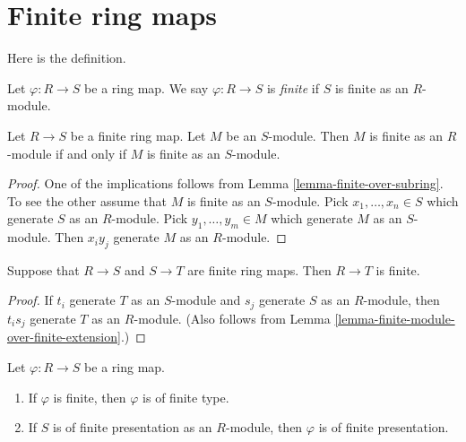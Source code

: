 \section{Finite ring maps}
\label{section-finite}

\noindent
Here is the definition.

\begin{definition}
\label{definition-finite-ring-map}
Let $\varphi : R \to S$ be a ring map. We say $\varphi : R \to S$ is
{\it finite} if $S$ is finite as an $R$-module.
\end{definition}

\begin{lemma}
\label{lemma-finite-module-over-finite-extension}
Let $R \to S$ be a finite ring map.
Let $M$ be an $S$-module.
Then $M$ is finite as an $R$-module if and only if $M$ is finite
as an $S$-module.
\end{lemma}

\begin{proof}
One of the implications follows from
Lemma \ref{lemma-finite-over-subring}.
To see the other assume that $M$ is finite as an $S$-module.
Pick $x_1, \ldots, x_n \in S$ which generate $S$ as an $R$-module.
Pick $y_1, \ldots, y_m \in M$ which generate $M$ as an $S$-module.
Then $x_i y_j$ generate $M$ as an $R$-module.
\end{proof}

\begin{lemma}
\label{lemma-finite-transitive}
Suppose that $R \to S$ and $S \to T$ are finite ring maps.
Then $R \to T$ is finite.
\end{lemma}

\begin{proof}
If $t_i$ generate $T$ as an $S$-module and $s_j$ generate $S$ as an
$R$-module, then $t_i s_j$ generate $T$ as an $R$-module.
(Also follows from
Lemma \ref{lemma-finite-module-over-finite-extension}.)
\end{proof}

\begin{lemma}
\label{lemma-finite-finite-type}
Let $\varphi : R \to S$ be a ring map.
\begin{enumerate}
\item If $\varphi$ is finite, then $\varphi$ is of finite type.
\item If $S$ is of finite presentation as an $R$-module, then
$\varphi$ is of finite presentation.
\end{enumerate}
\end{lemma}

